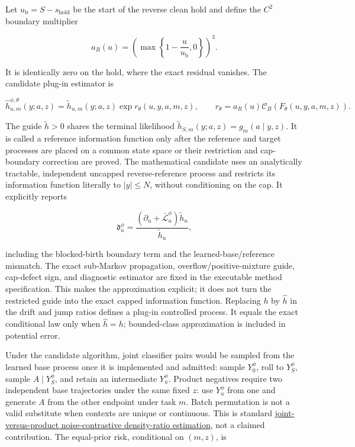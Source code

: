 \documentclass[11pt]{article}
\newcommand{\supportingfile}[2]{%
  \emph{#1} (\nolinkurl{#2})%
}
\def\supportingfile#1#2{#1}%
\begin{document}
Let \(u_{\mathrm b}=S-s_{\mathrm{hold}}\) be the start of the reverse clean hold and define the \(C^2\) boundary multiplier

\[
a_R(u)=\left(\max\left\{1-\frac{u}{u_{\mathrm b}},0\right\}\right)^3.
\]

It is identically zero on the hold, where the exact residual vanishes. The candidate plug-in estimator is

\[
\widehat h_{u,m}^{\phi,\theta}(y;a,z)
=\widetilde h_{u,m}(y;a,z)
\exp r_\theta(u,y,a,m,z),
\qquad
r_\theta=a_R(u)\mathcal C_B(F_\theta(u,y,a,m,z)).
\]

The guide \(\widetilde h>0\) shares the terminal likelihood \(\widetilde h_{S,m}(y;a,z)=g_m(a\mid y,z)\). It is called a reference information function only after the reference and target processes are placed on a common state space or their restriction and cap-boundary correction are proved. The mathematical candidate uses an analytically tractable, independent uncapped reverse-reference process and restricts its information function literally to \(|y|\le N\), without conditioning on the cap. It explicitly reports

\[
\mathfrak d_u^\phi
=\frac{(\partial_u+\bar{\mathcal L}_u^\phi)\widetilde h_u}
       {\widetilde h_u},
\]

including the blocked-birth boundary term and the learned-base/\allowbreak{}reference mismatch. The exact sub-Markov propagation, overflow/\allowbreak{}positive-mixture guide, cap-defect sign, and diagnostic estimator are fixed in the \supportingfile{executable method specification}{executable_method_spec.md}. This makes the approximation explicit; it does not turn the restricted guide into the exact capped information function. Replacing \(h\) by \(\widehat h\) in the drift and jump ratios defines a plug-in controlled process. It equals the exact conditional law only when \(\widehat h=h\); bounded-class approximation is included in potential error.

Under the candidate algorithm, joint classifier pairs would be sampled from the learned base process once it is implemented and admitted: sample \(Y_0^\phi\), roll to \(Y_S^\phi\), sample \(A\mid Y_S^\phi\), and retain an intermediate \(Y_u^\phi\). Product negatives require two independent base trajectories under the same fixed \(z\): use \(Y_u^\phi\) from one and generate \(A\) from the other endpoint under task \(m\). Batch permutation is not a valid substitute when contexts are unique or continuous. This is standard \href{https://proceedings.mlr.press/v9/gutmann10a.html}{joint-versus-product noise-contrastive density-ratio estimation}, not a claimed contribution. The equal-prior risk, conditional on \((m,z)\), is
\end{document}
